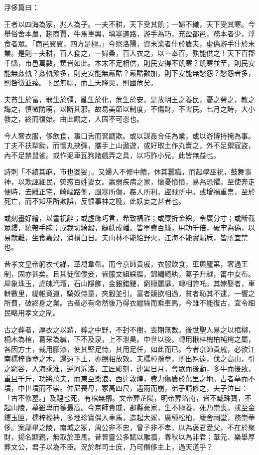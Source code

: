 \begin{pinyinscope}
浮侈篇曰：

王者以四海為家，兆人為子。一夫不耕，天下受其飢；一婦不織，天下受其寒。今舉俗舍本農，趨商賈，牛馬車輿，填塞道路，游手為巧，充盈都邑，務本者少，浮食者眾。「商邑翼翼，四方是極。」今察洛陽，資末業者什於農夫，虛偽游手什於末業。是則一夫耕，百人食之，一婦桑，百人衣之，以一奉百，孰能供之！天下百郡千縣，巿邑萬數，類皆如此。本末不足相供，則民安得不飢寒？飢寒並至，則民安能無姦軌？姦軌繁多，則吏安能無嚴酷？嚴酷數加，則下安能無愁怨？愁怨者多，則咎徵並臻。下民無聊，而上天降災，則國危矣。

夫貧生於富，弱生於彊，亂生於化，危生於安。是故明王之養民，憂之勞之，教之誨之，慎微防萌，以斷其邪。故易美節以制度，不傷財，不害民。七月之詩，大小教之，終而復始。由此觀之，人固不可恣也。

今人奢衣服，侈飲食，事口舌而習調欺。或以謀姦合任為業，或以游博持掩為事。丁夫不扶犁鋤，而懷丸挾彈，攜手上山遨遊，或好取土作丸賣之，外不足禦寇盜，內不足禁鼠雀。或作泥車瓦狗諸戲弄之具，以巧詐小兒，此皆無益也。

詩刺「不績其麻，巿也婆娑」。又婦人不修中饋，休其蠶織，而起學巫祝，鼓舞事神，以欺誣細民，熒惑百姓妻女。羸弱疾病之家，懷憂憤憤，易為恐懼。至使奔走便時，去離正宅，崎嶇路側，風寒所傷，姦人所利，盜賊所中。或增禍重祟，至於死亡，而不知巫所欺誤，反恨事神之晚，此妖妄之甚者也。

或刻畫好繒，以書祝辭；或虛飾巧言，希致福祚；或糜折金綵，令廣分寸；或斷截眾縷，繞帶手腕；或裁切綺縠，繨紩成幡。皆單費百縑，用功千倍，破牢為偽，以易就難，坐食嘉穀，消損白日。夫山林不能給野火，江海不能實漏卮，皆所宜禁也。

昔孝文皇帝躬衣弋綈，革舄韋帶。而今京師貴戚，衣服飲食，車輿廬第，奢過王制，固亦甚矣。且其徒御僕妾，皆服文組綵牒，錦繡綺紈，葛子升越，筩中女布。犀象珠玉，虎魄玳瑁，石山隱飾，金銀錯鏤，窮極麗靡，轉相誇吒。其嫁娶者，車軿數里，緹帷竟道，騎奴侍童，夾轂並引。富者競欲相過，貧者恥其不逮，一饗之所費，破終身之業。古者必有命然後乃得衣繒絲而乘車馬，今雖不能復古，宜令細民略用孝文之制。

古之葬者，厚衣之以薪，葬之中野，不封不樹，喪期無數。後世聖人易之以棺槨，桐木為棺，葛采為緘，下不及泉，上不泄臭。中世以後，轉用楸梓槐柏杶樗之屬，各因方土，裁用膠漆，使其堅足恃，其用足任，如此而已。今者京師貴戚，必欲江南檽梓豫章之木。邊遠下土，亦競相放效。夫檽樟豫章，所出殊遠，伐之高山，引之窮谷，入海乘淮，逆河泝洛，工匠彫刻，連累日月，會眾而後動，多牛而後致，重且千斤，功將萬夫，而東至樂浪，西達敦煌，費力傷農於萬里之地。古者墓而不墳，中世墳而不崇。仲尼喪母，冢高四尺，遇雨而崩，弟子請修之，夫子泣曰：「古不修墓。」及鯉也死，有棺無槨。文帝葬芷陽，明帝葬洛南，皆不臧珠寶，不起山陵，墓雖卑而德最高。今京師貴戚，郡縣豪家，生不極養，死乃崇喪。或至金縷玉匣，檽梓楩柟，多埋珍寶偶人車馬，造起大冢，廣種松柏，廬舍祠堂，務崇華侈。案鄗畢之陵，南城之冢，周公非不忠，曾子非不孝，以為褒君愛父，不在於聚財，揚名顯親，無取於車馬。昔晉靈公多賦以雕牆，春秋以為非君；華元、樂舉厚葬文公，君子以為不臣。況於群司士庶，乃可僭侈主上，過天道乎？


\end{pinyinscope}
